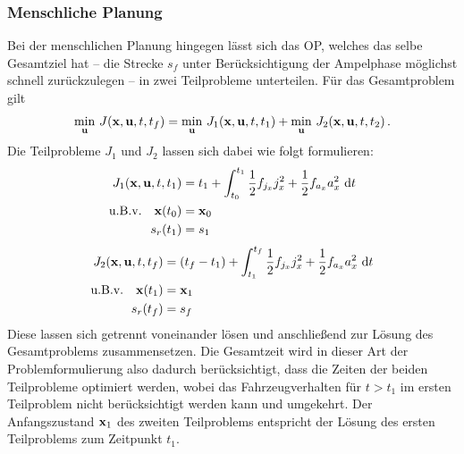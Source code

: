 \subsubsection{Menschliche Planung}\label{subsubsec:Mensch}
Bei der menschlichen Planung hingegen lässt sich das \gls{OP}, welches das selbe Gesamtziel hat -- die Strecke $s_f$ unter Berücksichtigung der Ampelphase möglichst schnell zurückzulegen -- in zwei Teilprobleme unterteilen. Für das Gesamtproblem gilt
\begin{equation}
\min_{\boldsymbol{\mathrm{u}}} \, J(\boldsymbol{\mathrm{x}},\boldsymbol{\mathrm{u}},t,t_f) = \min_{\boldsymbol{\mathrm{u}}} \, J_1(\boldsymbol{\mathrm{x}},\boldsymbol{\mathrm{u}},t,t_1) + \min_{\boldsymbol{\mathrm{u}}} \, J_2(\boldsymbol{\mathrm{x}},\boldsymbol{\mathrm{u}},t,t_2)\,.
\end{equation}
Die Teilprobleme $J_1$ und $J_2$ lassen sich dabei wie folgt formulieren:
	\begin{align}
	J_1(\boldsymbol{\mathrm{x}},\boldsymbol{\mathrm{u}},t,t_1) &= t_1 + \int_{t_0}^{t_1}\frac{1}{2}f_{j_x} j_x^2 + \frac{1}{2}f_{a_x} a_x^2~\textrm{d}{t} \\
	\textrm{u.B.v.} \quad \boldsymbol{\mathrm{x}}(t_0) &= \boldsymbol{\mathrm{x}}_0 \\
	s_r(t_1) &= s_1 
	\end{align}
	\begin{align}
	J_2(\boldsymbol{\mathrm{x}},\boldsymbol{\mathrm{u}},t,t_f) &= (t_f - t_1) + \int_{t_1}^{t_f}\frac{1}{2}f_{j_x} j_x^2 + \frac{1}{2}f_{a_x} a_x^2~\textrm{d}{t} \\
	\textrm{u.B.v.} \quad \boldsymbol{\mathrm{x}}(t_1) &= \boldsymbol{\mathrm{x}}_1 \\
	s_r(t_f) &= s_f 
	\end{align}
Diese lassen sich getrennt voneinander lösen und anschließend zur Lösung des Gesamtproblems zusammensetzen. Die Gesamtzeit wird in dieser Art der Problemformulierung also dadurch berücksichtigt, dass die Zeiten der beiden Teilprobleme optimiert werden, wobei das Fahrzeugverhalten für $t>t_1$ im ersten Teilproblem nicht berücksichtigt werden kann und umgekehrt. Der Anfangszustand $\boldsymbol{\mathrm{x}}_1$ des zweiten Teilproblems entspricht der Lösung des ersten Teilproblems zum Zeitpunkt $t_1$.

